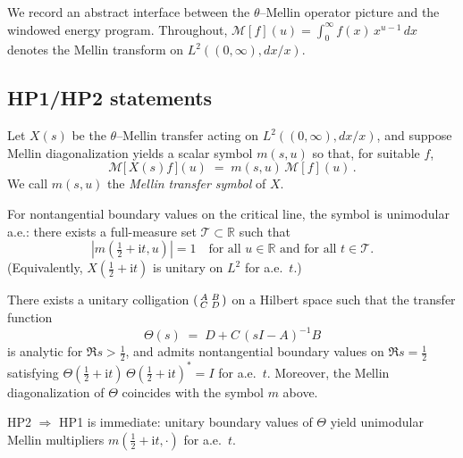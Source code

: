 We record an abstract interface between the $\theta$--Mellin operator picture and the windowed
energy program. Throughout, $\mathcal{M}[f](u)=\int_0^\infty f(x)\,x^{u-1}\,dx$ denotes the Mellin
transform on $L^2((0,\infty),dx/x)$.

\subsection*{HP1/HP2 statements}

\begin{definition}
Let $X(s)$ be the $\theta$--Mellin transfer acting on $L^2((0,\infty),dx/x)$, and suppose
Mellin diagonalization yields a scalar symbol $m(s,u)$ so that, for suitable $f$,
\[
\mathcal{M}\!\big[\,X(s)f\,\big](u)\;=\;m(s,u)\,\mathcal{M}[f](u)\,.
\]
We call $m(s,u)$ the \emph{Mellin transfer symbol} of $X$.
\end{definition}

\begin{description}[leftmargin=2.25em,labelsep=0.5em]
\item[HP1 (Boundary unitarity).]
For nontangential boundary values on the critical line, the symbol is unimodular a.e.:
there exists a full-measure set $\mathcal{T}\subset\mathbb{R}$ such that
\[
|m(\tfrac12+\mathrm{i}t,u)|=1\quad\text{for all $u\in\mathbb{R}$ and for all $t\in\mathcal{T}$}.
\]
(Equivalently, $X(\tfrac12+\mathrm{i}t)$ is unitary on $L^2$ for a.e.\ $t$.)

\item[HP2 (Conservative colligation / inner transfer).]
There exists a unitary colligation $\begin{psmallmatrix}A&B\\ C&D\end{psmallmatrix}$ on a Hilbert
space such that the transfer function
\[
\Theta(s)\;=\;D+C\,(sI-A)^{-1}B
\]
is analytic for $\Re s>\tfrac12$, and admits nontangential boundary values on $\Re s=\tfrac12$
satisfying $\Theta(\tfrac12+\mathrm{i}t)\,\Theta(\tfrac12+\mathrm{i}t)^{*}=I$ for a.e.\ $t$.
Moreover, the Mellin diagonalization of $\Theta$ coincides with the symbol $m$ above.
\end{description}

\begin{remark}
HP2 $\Rightarrow$ HP1 is immediate: unitary boundary values of $\Theta$ yield unimodular Mellin
multipliers $m(\tfrac12+\mathrm{i}t,\cdot)$ for a.e.\ $t$.
\end{remark}

